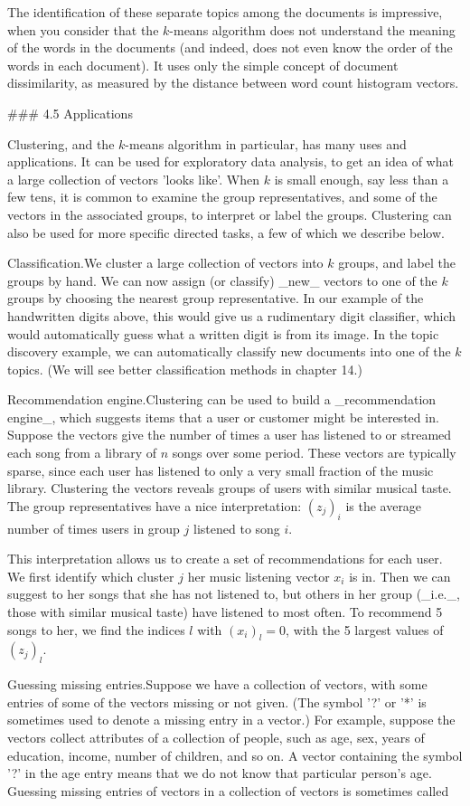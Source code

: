 The identification of these separate topics among the documents is impressive, when you consider that the \(k\)-means algorithm does not understand the meaning of the words in the documents (and indeed, does not even know the order of the words in each document). It uses only the simple concept of document dissimilarity, as measured by the distance between word count histogram vectors.

### 4.5 Applications

Clustering, and the \(k\)-means algorithm in particular, has many uses and applications. It can be used for exploratory data analysis, to get an idea of what a large collection of vectors 'looks like'. When \(k\) is small enough, say less than a few tens, it is common to examine the group representatives, and some of the vectors in the associated groups, to interpret or label the groups. Clustering can also be used for more specific directed tasks, a few of which we describe below.

Classification.We cluster a large collection of vectors into \(k\) groups, and label the groups by hand. We can now assign (or classify) _new_ vectors to one of the \(k\) groups by choosing the nearest group representative. In our example of the handwritten digits above, this would give us a rudimentary digit classifier, which would automatically guess what a written digit is from its image. In the topic discovery example, we can automatically classify new documents into one of the \(k\) topics. (We will see better classification methods in chapter 14.)

Recommendation engine.Clustering can be used to build a _recommendation engine_, which suggests items that a user or customer might be interested in. Suppose the vectors give the number of times a user has listened to or streamed each song from a library of \(n\) songs over some period. These vectors are typically sparse, since each user has listened to only a very small fraction of the music library. Clustering the vectors reveals groups of users with similar musical taste. The group representatives have a nice interpretation: \((z_{j})_{i}\) is the average number of times users in group \(j\) listened to song \(i\).

This interpretation allows us to create a set of recommendations for each user. We first identify which cluster \(j\) her music listening vector \(x_{i}\) is in. Then we can suggest to her songs that she has not listened to, but others in her group (_i.e._, those with similar musical taste) have listened to most often. To recommend 5 songs to her, we find the indices \(l\) with \((x_{i})_{l}=0\), with the 5 largest values of \((z_{j})_{l}\).

Guessing missing entries.Suppose we have a collection of vectors, with some entries of some of the vectors missing or not given. (The symbol '?' or '*' is sometimes used to denote a missing entry in a vector.) For example, suppose the vectors collect attributes of a collection of people, such as age, sex, years of education, income, number of children, and so on. A vector containing the symbol '?' in the age entry means that we do not know that particular person's age. Guessing missing entries of vectors in a collection of vectors is sometimes called 